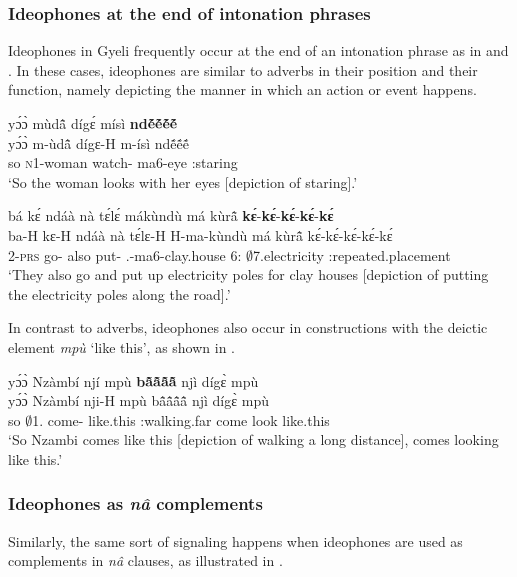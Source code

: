 \subsubsection*{Ideophones at the end of intonation phrases}
Ideophones in Gyeli frequently occur at the end of an intonation phrase as in  and . In these cases, ideophones are similar to adverbs in their position and their function, namely depicting the manner in which an action or event happens.


\ea \label{IDEOadv1}
  \glll yɔ́ɔ̀ mùdã̂ dígɛ́ mísì {\bfseries ndẽ́ẽ́ẽ́ẽ́} \\
       yɔ́ɔ̀ m-ùdã̂ dígɛ-H m-ísì ndẽ́ẽ́ẽ́ \\
        so \textsc{n}1-woman watch-{\R} ma6-eye {\IDEO}:staring \\
    \trans `So the woman looks with her eyes [depiction of staring].'
\z


\ea \label{IDEOadv2}
  \glll  bá kɛ́ ndáà nà tɛ́lɛ́ mákùndù má kùrã̂  {\bfseries kɛ́}-{\bfseries kɛ́}-{\bfseries kɛ́}-{\bfseries kɛ́}-{\bfseries kɛ́}\\
         ba-H kɛ-H ndáà nà tɛ́lɛ-H H-ma-kùndù má kùrã̂  kɛ́-kɛ́-kɛ́-kɛ́-kɛ́ \\
        2-\textsc{prs} go-{\R} also {\COM} put-{\R} {\OBJ}.{\LINK}-ma6-clay.house 6:{\ATT} $\emptyset$7.electricity {\IDEO}:repeated.placement \\
    \trans `They also go and put up electricity poles for clay houses [depiction of putting the electricity poles along the road].'
\z

In contrast to adverbs, ideophones also occur in constructions with the deictic element {\itshape mpù} `like this', as shown in .


\ea \label{IDEOadv3}
  \glll yɔ́ɔ̀ Nzàmbí njí mpù {\bfseries bã̂ã̂ã̂ã̂} njì dígɛ̀ mpù \\
        yɔ́ɔ̀ Nzàmbí nji-H mpù bã̂ã̂ã̂ã̂ njì dígɛ̀ mpù \\
        so $\emptyset$1.{\PN} come-{\R} like.this {\IDEO}:walking.far come look like.this \\
    \trans `So Nzambi comes like this [depiction of walking a long distance], comes looking like this.'
\z


\subsubsection*{Ideophones as {\itshape nâ} complements} Similarly, the same sort of signaling happens when ideophones are used as complements in {\itshape nâ} clauses, as illustrated in .

